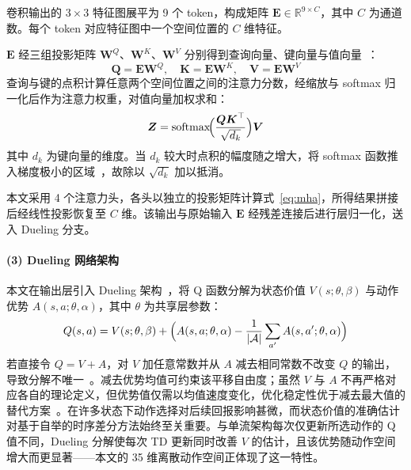\documentclass{iopjournal}
\begin{document}
卷积输出的 $3\times3$ 特征图展平为 9 个 token，构成矩阵 $\boldsymbol{E}\in\mathbb{R}^{9\times C}$，其中 $C$ 为通道数。每个 token 对应特征图中一个空间位置的 $C$ 维特征。

$\boldsymbol{E}$ 经三组投影矩阵 $\boldsymbol{W}^Q$、$\boldsymbol{W}^K$、$\boldsymbol{W}^V$ 分别得到查询向量、键向量与值向量~\cite{vaswani2017attention}：
\begin{equation}
  \boldsymbol{Q}=\boldsymbol{E}\boldsymbol{W}^Q,\quad
  \boldsymbol{K}=\boldsymbol{E}\boldsymbol{W}^K,\quad
  \boldsymbol{V}=\boldsymbol{E}\boldsymbol{W}^V
\end{equation}
查询与键的点积计算任意两个空间位置之间的注意力分数，经缩放与 softmax 归一化后作为注意力权重，对值向量加权求和：
\begin{equation}\label{eq:mha}
  \boldsymbol{Z} = \mathrm{softmax}\!\Bigl(\frac{\boldsymbol{Q}\boldsymbol{K}^\top}{\sqrt{d_k}}\Bigr)\boldsymbol{V}
\end{equation}
其中 $d_k$ 为键向量的维度。当 $d_k$ 较大时点积的幅度随之增大，将 softmax 函数推入梯度极小的区域~\cite{vaswani2017attention}，故除以 $\sqrt{d_k}$ 加以抵消。

本文采用 4 个注意力头，各头以独立的投影矩阵计算式~\eqref{eq:mha}，所得结果拼接后经线性投影恢复至 $C$ 维。该输出与原始输入 $\boldsymbol{E}$ 经残差连接后进行层归一化，送入 Dueling 分支。

\paragraph{(3) Dueling 网络架构}\label{sec:md}

本文在输出层引入 Dueling 架构~\cite{wang2016dueling}，将 Q 函数分解为状态价值 $V(s;\theta,\beta)$ 与动作优势 $A(s,a;\theta,\alpha)$，其中 $\theta$ 为共享层参数：
\begin{equation}\label{eq:dueling_q}
  Q(s,a) = V(s;\theta,\beta) + \Bigl(A(s,a;\theta,\alpha)
           - \frac{1}{|\mathcal{A}|}\sum_{a'}A(s,a';\theta,\alpha)\Bigr)
\end{equation}
若直接令 $Q = V + A$，对 $V$ 加任意常数并从 $A$ 减去相同常数不改变 $Q$ 的输出，导致分解不唯一~\cite{wang2016dueling}。减去优势均值可约束该平移自由度；虽然 $V$ 与 $A$ 不再严格对应各自的理论定义，但优势值仅需以均值速度变化，优化稳定性优于减去最大值的替代方案~\cite{wang2016dueling}。在许多状态下动作选择对后续回报影响甚微，而状态价值的准确估计对基于自举的时序差分方法始终至关重要。与单流架构每次仅更新所选动作的 Q 值不同，Dueling 分解使每次 TD 更新同时改善 $V$ 的估计，且该优势随动作空间增大而更显著——本文的 35 维离散动作空间正体现了这一特性。
\end{document}

